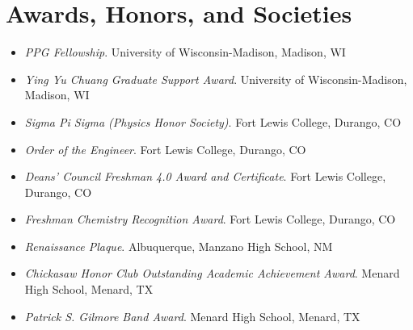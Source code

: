\section{Awards, Honors, and Societies}

\begin{itemize}
    \item \textit{PPG Fellowship}. University of Wisconsin-Madison, Madison, WI
    \item \textit{Ying Yu Chuang Graduate Support Award}. University of Wisconsin-Madison, Madison, WI
    \item \textit{Sigma Pi Sigma (Physics Honor Society)}. Fort Lewis College, Durango, CO
    \item \textit{Order of the Engineer}. Fort Lewis College, Durango, CO
    \item \textit{Deans' Council Freshman 4.0 Award and Certificate}. Fort Lewis College, Durango, CO
    \item \textit{Freshman Chemistry Recognition Award}. Fort Lewis College, Durango, CO
    \item \textit{Renaissance Plaque}. Albuquerque, Manzano High School, NM
    \item \textit{Chickasaw Honor Club Outstanding Academic Achievement Award}. Menard High School, Menard, TX
    \item \textit{Patrick S. Gilmore Band Award}. Menard High School, Menard, TX
\end{itemize}